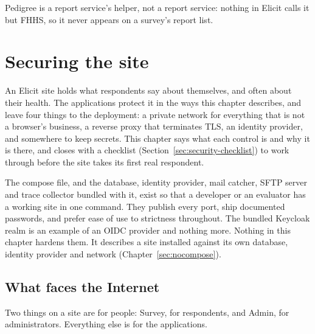 \documentclass[11pt, a4paper]{article}
\begin{document}
Pedigree is a report service's helper, not a report service: nothing in Elicit calls it but
FHHS, so it never appears on a survey's report list.


\section{Securing the site}
\label{sec:security}

An Elicit site holds what respondents say about themselves, and often about their health. The
applications protect it in the ways this chapter describes, and leave four things to the
deployment: a private network for everything that is not a browser's business, a reverse proxy
that terminates TLS, an identity provider, and somewhere to keep secrets. This chapter says
what each control is and why it is there, and closes with a checklist
(Section~\ref{sec:security-checklist}) to work through before the site takes its first real
respondent.

\begin{elicitsecurity}
The compose file, and the database, identity provider, mail catcher, SFTP server and trace
collector bundled with it, exist so that a developer or an evaluator has a working site in one
command. They publish every port, ship documented passwords, and prefer ease of use to
strictness throughout. The bundled Keycloak realm is an example of an OIDC provider and nothing
more. Nothing in this chapter hardens them. It describes a site installed against its own
database, identity provider and network (Chapter~\ref{sec:nocompose}).
\end{elicitsecurity}

\subsection{What faces the Internet}
\label{sec:security-exposure}

Two things on a site are for people: Survey, for respondents, and Admin, for administrators.
Everything else is for the applications.
\end{document}
